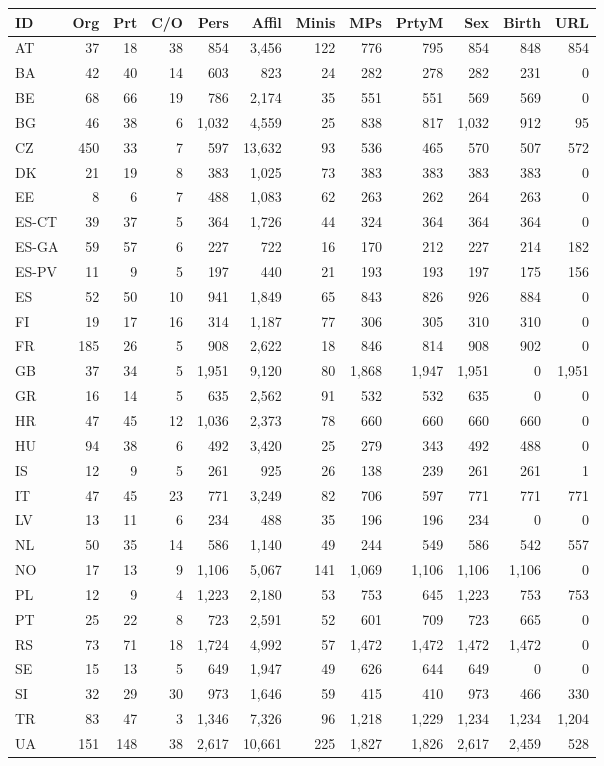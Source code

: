 \begin{tabular}{l|rrr|rrrrrrrr}
ID&Org&Prt&C/O&Pers&Affil&Minis&MPs&PrtyM&Sex&Birth&URL\\
\hline
AT&37&18&38&854&3,456&122&776&795&854&848&854\\
BA&42&40&14&603&823&24&282&278&282&231&0\\
BE&68&66&19&786&2,174&35&551&551&569&569&0\\
BG&46&38&6&1,032&4,559&25&838&817&1,032&912&95\\
CZ&450&33&7&597&13,632&93&536&465&570&507&572\\
DK&21&19&8&383&1,025&73&383&383&383&383&0\\
EE&8&6&7&488&1,083&62&263&262&264&263&0\\
ES-CT&39&37&5&364&1,726&44&324&364&364&364&0\\
ES-GA&59&57&6&227&722&16&170&212&227&214&182\\
ES-PV&11&9&5&197&440&21&193&193&197&175&156\\
ES&52&50&10&941&1,849&65&843&826&926&884&0\\
FI&19&17&16&314&1,187&77&306&305&310&310&0\\
FR&185&26&5&908&2,622&18&846&814&908&902&0\\
GB&37&34&5&1,951&9,120&80&1,868&1,947&1,951&0&1,951\\
GR&16&14&5&635&2,562&91&532&532&635&0&0\\
HR&47&45&12&1,036&2,373&78&660&660&660&660&0\\
HU&94&38&6&492&3,420&25&279&343&492&488&0\\
IS&12&9&5&261&925&26&138&239&261&261&1\\
IT&47&45&23&771&3,249&82&706&597&771&771&771\\
LV&13&11&6&234&488&35&196&196&234&0&0\\
NL&50&35&14&586&1,140&49&244&549&586&542&557\\
NO&17&13&9&1,106&5,067&141&1,069&1,106&1,106&1,106&0\\
PL&12&9&4&1,223&2,180&53&753&645&1,223&753&753\\
PT&25&22&8&723&2,591&52&601&709&723&665&0\\
RS&73&71&18&1,724&4,992&57&1,472&1,472&1,472&1,472&0\\
SE&15&13&5&649&1,947&49&626&644&649&0&0\\
SI&32&29&30&973&1,646&59&415&410&973&466&330\\
TR&83&47&3&1,346&7,326&96&1,218&1,229&1,234&1,234&1,204\\
UA&151&148&38&2,617&10,661&225&1,827&1,826&2,617&2,459&528\\
\end{tabular}
